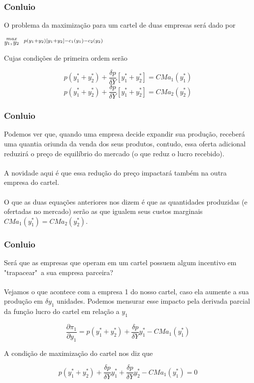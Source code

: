 \documentclass{beamer}[10]
\begin{document}
\begin{frame}
	\frametitle{Conluio}

	O problema da maximização para um cartel de duas empresas será dado por

	\begin{center}
		\LARGE $\stackrel{max}{\text{\small $y_1,y_2$}} \ \ \stackrel{p(y_1+y_2)[y_1 + y_2] - c_1(y_1) - c_2(y_2)}{\ }$ \\
	\end{center}

	Cujas condições de primeira ordem serão

	$$p(y_1^* + y_2^*) + \frac{\delta p}{\delta Y}[y_1^* + y_2^*] = CMa_1(y_1^*)$$
	$$p(y_1^* + y_2^*) + \frac{\delta p}{\delta Y}[y_1^* + y_2^*] = CMa_2(y_2^*)$$

\end{frame}

\begin{frame}
	\frametitle{Conluio}

	Podemos ver que, quando uma empresa decide expandir sua produção, receberá uma quantia oriunda da venda dos seus produtos, contudo, essa oferta adicional reduzirá o preço de equilíbrio do mercado (o que reduz o lucro recebido). 
	\\~\\
	A novidade aqui é que essa redução do preço impactará também na outra empresa do cartel.
	\\~\\
	O que as duas equações anteriores nos dizem é que as quantidades produzidas (e ofertadas no mercado) serão as que igualem seus custos marginais $CMa_1(y_1^*) = CMa_2(y_2^*)$. 

\end{frame}

\begin{frame}
	\frametitle{Conluio}

	Será que as empresas que operam em um cartel possuem algum incentivo em "trapacear"\ a sua empresa parceira?
	\\~\\
	Vejamos o que acontece com a empresa 1 do nosso cartel, caso ela aumente a sua produção em $\delta y_1$ unidades. Podemos mensurar esse impacto pela derivada parcial da função lucro do cartel em relação a $y_1$

	$$ \frac{\partial \pi_1}{\partial y_1} = p(y_1^* + y_2^*) + \frac{\delta p}{\delta Y}y_1^* - CMa_1(y_1^*) $$ 

	A condição de maximização do cartel nos diz que

	$$ p(y_1^* + y_2^*) + \frac{\delta p}{\delta Y}y_1^* + \frac{\delta p}{\delta Y}y_2^* - CMa_1(y_1^*) = 0 $$ 

\end{frame}
\end{document}
